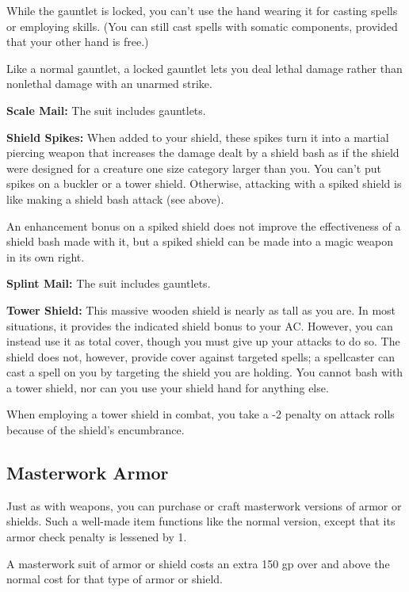 While the gauntlet is locked, you can't use the hand wearing it for casting spells 
or employing skills. (You can still cast spells with somatic components, provided 
that your other hand is free.)

Like a normal gauntlet, a locked gauntlet lets you deal lethal damage rather than 
nonlethal damage with an unarmed strike.

\textbf{Scale Mail:} The suit includes gauntlets.

\textbf{Shield Spikes:} When added to your shield, these spikes turn it into a 
martial piercing weapon that increases the damage dealt by a shield bash as if 
the shield were designed for a creature one size category larger than you. You 
can't put spikes on a buckler or a tower shield. Otherwise, attacking with a spiked 
shield is like making a shield bash attack (see above).

An enhancement bonus on a spiked shield does not improve the effectiveness of a 
shield bash made with it, but a spiked shield can be made into a magic weapon in 
its own right.

\textbf{Splint Mail:} The suit includes gauntlets.

\textbf{Tower Shield:} This massive wooden shield is nearly as tall as you are. 
In most situations, it provides the indicated shield bonus to your AC. However, 
you can instead use it as total cover, though you must give up your attacks to 
do so. The shield does not, however, provide cover against targeted spells; a spellcaster 
can cast a spell on you by targeting the shield you are holding. You cannot bash 
with a tower shield, nor can you use your shield hand for anything else.

When employing a tower shield in combat, you take a -2 penalty on attack rolls 
because of the shield's encumbrance.

\subsection{Masterwork Armor}

Just as with weapons, you can purchase or craft masterwork versions of armor or 
shields. Such a well-made item functions like the normal version, except that its 
armor check penalty is lessened by 1. 

A masterwork suit of armor or shield costs an extra 150 gp over and above the normal 
cost for that type of armor or shield.

